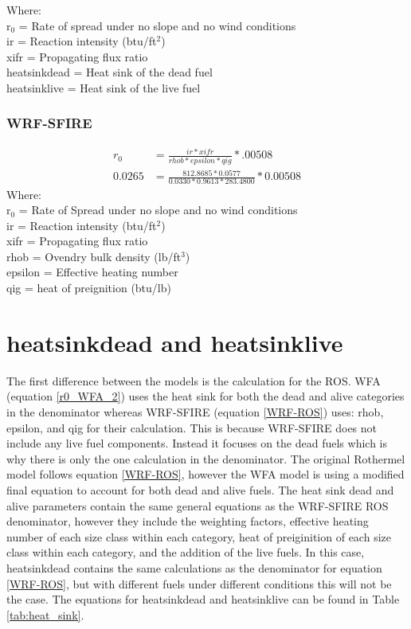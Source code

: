 \documentclass{article}
\newcommand\und{\textunderscore}
\begin{document}
\noindent Where: \\
r$_0$ = Rate of spread under no slope and no wind conditions \\
ir = Reaction intensity (btu/ft$^2$) \\
xifr = Propagating flux ratio \\
heat\und sink\und dead = Heat sink of the dead fuel \\
heat\und sink\und live = Heat sink of the live fuel
\subsubsection*{WRF-SFIRE}
\begin{equation}
	\label{WRF-ROS}
	\begin{split}
		r_0 &= \frac{ir*xifr}{rhob * epsilon *qig} * .00508 \\
		0.0265 &= \frac{812.8685 * 0.0577}{0.0330 * 0.9613 * 283.4800} * 0.00508
	\end{split}
\end{equation}
\noindent Where: \\
r$_0$ = Rate of Spread under no slope and no wind conditions \\
ir = Reaction intensity (btu/ft$^2$) \\
xifr = Propagating flux ratio \\
rhob = Ovendry bulk density (lb/ft$^3$) \\
epsilon = Effective heating number \\
qig = heat of preignition (btu/lb)\\

\section{heat\und sink\und dead and heat\und sink\und live}
The first difference between the models is the calculation for the ROS. WFA (equation \ref{r0_WFA_2}) uses the heat sink for both the dead and alive categories in the denominator whereas WRF-SFIRE (equation \ref{WRF-ROS}) uses: rhob, epsilon, and qig for their calculation. This is because WRF-SFIRE does not include any live fuel components. Instead it focuses on the dead fuels which is why there is only the one calculation in the denominator. The original Rothermel model follows equation \ref{WRF-ROS}, however the WFA model is using a modified final equation to account for both dead and alive fuels. The heat sink dead and alive parameters contain the same general equations as the WRF-SFIRE ROS denominator, however they include the weighting factors, effective heating number of each size class within each category, heat of preiginition of each size class within each category, and the addition of the live fuels. In this case, heatsink\und dead contains the same calculations as the denominator for equation \ref{WRF-ROS}, but with different fuels under different conditions this will not be the case. The equations for heat\und sink\und dead and heat\und sink\und live can be found in Table \ref{tab:heat_sink}.
\end{document}
